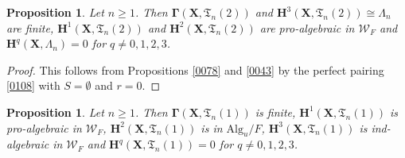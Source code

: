 \documentclass{amsart}
\newtheorem{Prop}[Thm]{Proposition}
\theoremstyle{remark}
\numberwithin{equation}{section}
\newcommand{\Alg}{\mathrm{Alg}}
\newcommand{\alg}[1]{\mathbf{#1}}
\begin{document}
\begin{Prop}
	Let $n \ge 1$.
	Then $\alg{\Gamma}(\alg{X}, \mathfrak{T}_{n}(2))$ and
	$\alg{H}^{3}(\alg{X}, \mathfrak{T}_{n}(2)) \cong \Lambda_{n}$ are finite,
	$\alg{H}^{1}(\alg{X}, \mathfrak{T}_{n}(2))$ and
	$\alg{H}^{2}(\alg{X}, \mathfrak{T}_{n}(2))$ are pro-algebraic in $\mathcal{W}_{F}$
	and $\alg{H}^{q}(\alg{X}, \Lambda_{n}) = 0$ for $q \ne 0, 1, 2, 3$.
\end{Prop}

\begin{proof}
	This follows from Propositions \ref{0078} and \ref{0043} by
	the perfect pairing \eqref{0108} with $S = \emptyset$ and $r = 0$.
\end{proof}

\begin{Prop} \label{0046}
	Let $n \ge 1$.
	Then $\alg{\Gamma}(\alg{X}, \mathfrak{T}_{n}(1))$ is finite,
	$\alg{H}^{1}(\alg{X}, \mathfrak{T}_{n}(1))$ is pro-algebraic in $\mathcal{W}_{F}$,
	$\alg{H}^{2}(\alg{X}, \mathfrak{T}_{n}(1))$ is in $\Alg_{u} / F$,
	$\alg{H}^{3}(\alg{X}, \mathfrak{T}_{n}(1))$ is ind-algebraic in $\mathcal{W}_{F}$
	and $\alg{H}^{q}(\alg{X}, \mathfrak{T}_{n}(1)) = 0$ for $q \ne 0, 1, 2, 3$.
\end{Prop}
\end{document}
